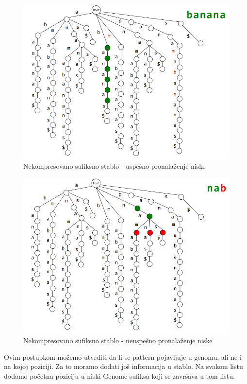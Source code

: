 \begin{figure}[h!]
\centering
\includegraphics[scale=0.5]{poglavlja/9/slike/sufiksnoStabloNekompresovanoPogodak.png}
\caption{Nekompresovano sufiksno stablo - uspešno pronalaženje niske}
\label{slika:X}
\end{figure}

\begin{figure}[h!]
\centering
\includegraphics[scale=0.5]{poglavlja/9/slike/sufiksnoStabloNekompresovanoGreska.png}
\caption{Nekompresovano sufiksno stablo - neuspešno pronalaženje niske}
\label{slika:X}
\end{figure}


Ovim postupkom možemo utvrditi da li se pattern pojavljuje u genomu, ali ne i na kojoj poziciji. Za to moramo dodati još informacija u stablo. Na svakom listu dodamo početnu poziciju u niski Genome sufiksa koji se završava u tom listu.


